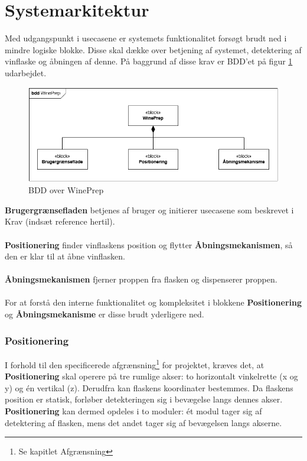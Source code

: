 \section{Systemarkitektur}
Med udgangspunkt i usecasene er systemets funktionalitet forsøgt brudt ned i mindre logiske blokke. Disse skal dække over betjening af systemet, detektering af vinflaske og åbningen af denne. På baggrund af disse krav er BDD'et på figur \ref{BDD_WinePrep} udarbejdet.

\begin{figure}[H]
	\centerline{\includegraphics[scale=0.33]{tex/Arkitektur/Diagrammer/BDD_WinePrep}}
	\caption{BDD over WinePrep}
	\label{BDD_WinePrep}
\end{figure}

\noindent\textbf{Brugergrænsefladen} betjenes af bruger og initierer usecasene som beskrevet i Krav (indsæt reference hertil).
\\
\\
\textbf{Positionering} finder vinflaskens position og flytter \textbf{Åbningsmekanismen}, så den er klar til at åbne vinflasken.
\\
\\
\textbf{Åbningsmekanismen} fjerner proppen fra flasken og dispenserer proppen.
\\
\\
For at forstå den interne funktionalitet og kompleksitet i blokkene \textbf{Positionering} og \textbf{Åbningsmekanisme} er disse brudt yderligere ned.

\subsubsection{Positionering}
I forhold til den specificerede afgrænsning\footnote{Se kapitlet Afgrænsning} for projektet, kræves det, at \textbf{Positionering} skal operere på tre rumlige akser: to horizontalt vinkelrette (x og y) og én vertikal (z). Derudfra kan flaskens koordinater bestemmes. Da flaskens position er statisk, forløber detekteringen sig i bevægelse langs dennes akser. \textbf{Positionering} kan dermed opdeles i to moduler: ét modul tager sig af detektering af flasken, mens det andet tager sig af bevægelsen langs akserne.


